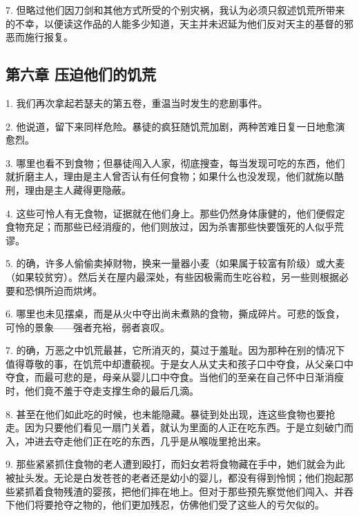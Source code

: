 7. 但略过他们因刀剑和其他方式所受的个别灾祸，我认为必须只叙述饥荒所带来的不幸，以便读这作品的人能多少知道，天主并未迟延为他们反对天主的基督的邪恶而施行报复。\par


\subsection{第六章 压迫他们的饥荒}

1. 我们再次拿起若瑟夫的第五卷，重温当时发生的悲剧事件。\par

2. 他说道，留下来同样危险。暴徒的疯狂随饥荒加剧，两种苦难日复一日地愈演愈烈。\par

3. 哪里也看不到食物；但暴徒闯入人家，彻底搜查，每当发现可吃的东西，他们就折磨主人，理由是主人曾否认有任何食物；如果什么也没发现，他们就施以酷刑，理由是主人藏得更隐蔽。\par

4. 这些可怜人有无食物，证据就在他们身上。那些仍然身体康健的，他们便假定食物充足；而那些已经消瘦的，他们则放过，因为杀害那些快要饿死的人似乎荒谬。\par

5. 的确，许多人偷偷卖掉财物，换来一量器小麦（如果属于较富有阶级）或大麦（如果较贫穷）。然后关在屋内最深处，有些因极需而生吃谷粒，另一些则根据必要和恐惧所迫而烘烤。\par

6. 哪里也未见摆桌，而是从火中夺出尚未煮熟的食物，撕成碎片。可悲的饭食，可怜的景象——强者充裕，弱者哀叹。\par

7. 的确，万恶之中饥荒最甚，它所消灭的，莫过于羞耻。因为那种在别的情况下值得尊敬的事，在饥荒中却遭藐视。于是女人从丈夫和孩子口中夺食，从父亲口中夺食，而最可悲的是，母亲从婴儿口中夺食。当他们的至亲在自己怀中日渐消瘦时，他们竟不羞于夺走支撑生命的最后几滴。\par

8. 甚至在他们如此吃的时候，也未能隐藏。暴徒到处出现，连这些食物也要抢走。因为只要他们看见一扇门关着，就认为里面的人正在吃东西。于是立刻破门而入，冲进去夺走他们正在吃的东西，几乎是从喉咙里抢出来。\par

9. 那些紧紧抓住食物的老人遭到殴打，而妇女若将食物藏在手中，她们就会为此被扯头发。无论是白发苍苍的老者还是幼小的婴儿，都没有得到怜悯；他们抱起那些紧抓着食物残渣的婴孩，把他们摔在地上。但对于那些预先察觉他们闯入、并吞下他们将要抢夺之物的，他们更加残忍，仿佛他们受了这些人的亏欠似的。\par


